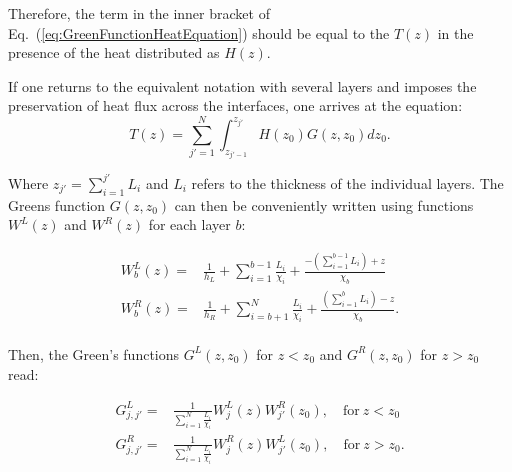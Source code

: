 \documentclass[%
9pt,
 aip,
rsi,%
 amsmath,amssymb,
preprint,%
]{revtex4-1}
\begin{document}
Therefore, the term in the inner bracket of Eq.~(\ref{eq:GreenFunctionHeatEquation}) should be equal to the $T(z)$ in the presence of the heat distributed as $H(z)$. 

If one returns to the equivalent notation with several layers and imposes the preservation of heat flux across the interfaces, one arrives at the equation: %
\begin{equation}
	T(z) = \sum_{j'=1}^{N} \int_{z_{j'-1}}^{z_{j'}} H(z_0) G(z,z_0) dz_0.
    \label{eq:GreenFunctionSolution}
\end{equation}

Where $z_{j'}=\sum_{i=1}^{j'} L_i$ and $L_{i}$ refers to the thickness of the individual layers.
The Greens function $G(z,z_0)$ can then be conveniently written using functions $W^L(z)$ and $W^R(z)$ for each layer $b$:%


\begin{subequations}
	 \begin{align}
		W_b^L(z) =& \frac{1}{h_L}+\sum_{i=1}^{b-1} \frac{L_i}{\chi_i} + \frac{-\left( \sum_{i=1}^{b-1} L_i \right) + z}{\chi_b} \label{eq:WL}\\
        W_b^R(z) =& \frac{1}{h_R}+\sum_{i=b+1}^{N} \frac{L_i}{\chi_i} + \frac{\left( \sum_{i=1}^{b} L_i \right)  - z}{\chi_b}. \label{eq:WR}\\
	\end{align}
    \label{eq:Wfunction}
\end{subequations}

Then, the Green's functions $G^{L}(z,z_0)$ for $z<z_0$ and $G^{R}(z,z_0)$ for $z>z_0$ read:

\begin{subequations}
	 \begin{align}
        G_{j,j'}^L =& \frac{1}{\sum_{i=1}^{N} \frac{L_i}{\chi_i}} W^L_{j}(z) W^R_{j'}(z_0), \quad \mathrm{for~} z<z_0 \label{eq:GL}\\
        G_{j,j'}^R =& \frac{1}{\sum_{i=1}^{N} \frac{L_i}{\chi_i}} W^R_{j}(z) W^L_{j'}(z_0), \quad \mathrm{for~} z>z_0. \label{eq:GR}
	\end{align}
    \label{eq:greenfunction}
\end{subequations}
\end{document}
